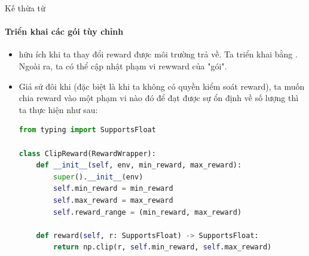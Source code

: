 \documentclass[10pt,aspectratio=169]{beamer}
\begin{document}
\begin{frame}[fragile]{Kế thừa từ }
\framesubtitle{Triển khai các gói tùy chỉnh}
\begin{itemize}
\setlength\itemsep{4pt}
\item {} hữu ích khi ta thay đổi reward được môi trường trả về. Ta triển khai  bằng . Ngoài ra, ta có thể cập nhật phạm vi rewward của "gói".
\item Giả sử đôi khi (đặc biệt là khi ta không có quyền kiểm soát reward), ta muốn chia reward vào một phạm vi nào đó để đạt được sự ổn định về số lượng thì ta thực hiện như sau:
\scriptsize
\begin{lstlisting}[language=Python]
from typing import SupportsFloat

class ClipReward(RewardWrapper):
    def __init__(self, env, min_reward, max_reward):
        super().__init__(env)
        self.min_reward = min_reward
        self.max_reward = max_reward
        self.reward_range = (min_reward, max_reward)

    def reward(self, r: SupportsFloat) -> SupportsFloat:
        return np.clip(r, self.min_reward, self.max_reward)
\end{lstlisting}
\end{itemize}
\end{frame}
\end{document}
